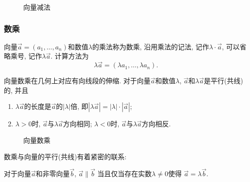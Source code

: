 \begin{figure}[htbp]
  \centering
  \caption{向量减法}
  \label{fig:vector-sub}
\end{figure}

\subsubsection{数乘}

向量$\vec{a}=(a_1,\dots,a_n)$和数值$\lambda$的乘法称为数乘,
沿用乘法的记法, 记作$\lambda\cdot\vec{a}$,
可以省略乘号, 记作$\lambda\vec{a}$. 计算方法为
\[
  \lambda\vec{a} = (\lambda a_1,\dots,\lambda a_n).
\]

向量数乘在几何上对应有向线段的伸缩.
对于向量$\vec{a}$和数值$\lambda$,
$\vec{a}$和$\lambda\vec{a}$是平行(共线)的, 并且
\begin{enumerate}[label=(\alph*)]
  \item $\lambda\vec{a}$的长度是$\vec{a}$的$|\lambda|$倍,
        即$|\lambda\vec{a}| = |\lambda| \cdot |\vec{a}|$;
  \item $\lambda>0$时, $\vec{a}$与$\lambda\vec{a}$方向相同;
        $\lambda<0$时, $\vec{a}$与$\lambda\vec{a}$方向相反.
\end{enumerate}

\begin{figure}[htbp]
  \centering
  \caption{向量数乘}
  \label{fig:vector-mulnum}
\end{figure}

数乘与向量的平行(共线)有着紧密的联系:

\begin{theorem}\label{thm:vec-num-mul}
  对于向量$\vec{a}$和非零向量$\vec{b}$,
  $\vec{a}\parallel\vec{b}$
  当且仅当存在实数$\lambda\neq0$使得
  $\vec{a} = \lambda\vec{b}$.
\end{theorem}

